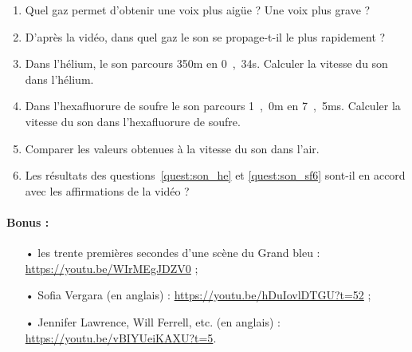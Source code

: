 \documentclass[12pt,a4paper]{article}
\begin{document}
\begin{enumerate}[resume]
\item Quel gaz permet d'obtenir une voix plus aigüe ?
Une voix plus grave ?

\item D'après la vidéo, dans quel gaz le son se propage-t-il le plus rapidement ?

\item Dans l'hélium, le son parcours \unit{350}{m} en \unit{0{,}34}{s}.
Calculer la vitesse du son dans l'hélium.
\label{quest:son_he}

\item Dans l'hexafluorure de soufre le son parcours \unit{1{,}0}{m} en \unit{7{,}5}{ms}.
Calculer la vitesse du son dans l'hexafluorure de soufre.
\label{quest:son_sf6}

\item Comparer les valeurs obtenues à la vitesse du son dans l'air.

\item Les résultats des questions~\ref{quest:son_he} et \ref{quest:son_sf6} sont-il en accord avec les affirmations de la vidéo ?

\end{enumerate}

\paragraph{Bonus :}
\begin{itemize}
\item[•] les trente premières secondes d'une scène du Grand bleu : \href{https://youtu.be/WIrMEgJDZV0}{https://youtu.be/WIrMEgJDZV0} ;
\item[•] Sofia Vergara (en anglais) : \href{https://youtu.be/hDuIovlDTGU?t=52}{https://youtu.be/hDuIovlDTGU?t=52} ;
\item[•] Jennifer Lawrence, Will Ferrell, etc. (en anglais) : \href{https://youtu.be/vBIYUeiKAXU?t=5}{https://youtu.be/vBIYUeiKAXU?t=5}.
\end{itemize}
\end{document}
